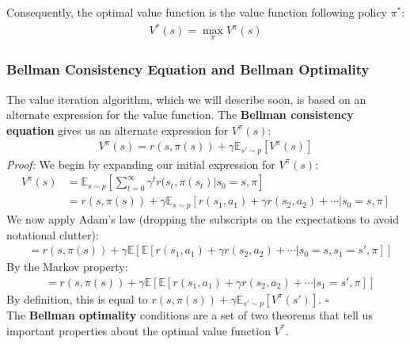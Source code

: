 Consequently, the optimal value function is the value function following policy $\pi^*$:
\begin{align*}
V^*(s) = \max_{\pi} V^{\pi}(s)
\end{align*}

\subsubsection{Bellman Consistency Equation and Bellman Optimality}
The value iteration algorithm, which we will describe soon, is based on an alternate expression for the value function. The \textbf{Bellman consistency equation} gives us an alternate expression for $V^{\pi}(s)$:
\begin{align*}
    V^{\pi}(s) = r(s, \pi(s)) + \gamma \mathbb{E}_{s' \sim p} [V^{\pi}(s)]
\end{align*}
\textit{Proof:} We begin by expanding our initial expression for $V^{\pi}(s)$:
\begin{align*}
V^{\pi}(s) &= \mathbb{E}_{s \sim p}\left[\sum_{t = 0}^\infty \gamma^t r(s_t, \pi(s_t)|s_0 = s, \pi\right]\\
&= r(s, \pi(s)) + \gamma\mathbb{E}_{s \sim p}\left[r(s_1, a_1) + \gamma r(s_2, a_2) + \cdots | s_0 = s, \pi\right]
\end{align*}
We now apply Adam's law (dropping the subscripts on the expectations to avoid notational clutter):
\begin{align*}
&= r(s, \pi(s)) + \gamma\mathbb{E}[\mathbb{E}[r(s_1, a_1) + \gamma r(s_2, a_2) + \cdots |s_0 = s, s_1 = s', \pi]]
\end{align*}
By the Markov property:
\begin{align*}
    &= r(s, \pi(s)) + \gamma \mathbb{E}[\mathbb{E}[r(s_1, a_1) + \gamma r(s_2, a_2) + \cdots | s_1 = s', \pi]]
\end{align*}
By definition, this is equal to $r(s, \pi(s)) + \gamma \mathbb{E}_{s' \sim p}[V^{\pi}(s')]$. $\square$\\

The \textbf{Bellman optimality} conditions are a set of two theorems that tell us important properties about the optimal value function $V^*$.\\

